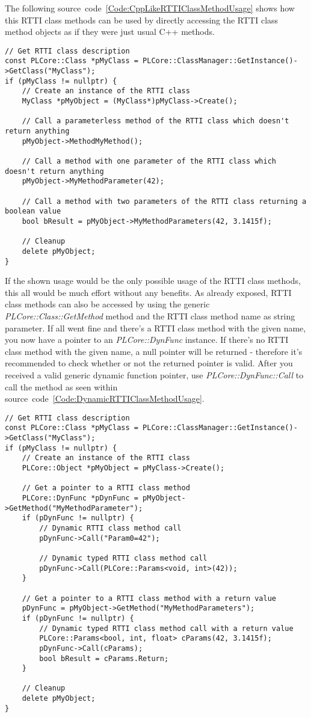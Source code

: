 The following source~code~\ref{Code:CppLikeRTTIClassMethodUsage} shows how this RTTI class methods can be used by directly accessing the RTTI class method objects as if they were just usual C++ methods.
\begin{lstlisting}[label=Code:CppLikeRTTIClassMethodUsage,caption={Accessing RTTI class method objects as if they were just usual C++ methods}]
// Get RTTI class description
const PLCore::Class *pMyClass = PLCore::ClassManager::GetInstance()->GetClass("MyClass");
if (pMyClass != nullptr) {
	// Create an instance of the RTTI class
	MyClass *pMyObject = (MyClass*)pMyClass->Create();

	// Call a parameterless method of the RTTI class which doesn't return anything
	pMyObject->MethodMyMethod();

	// Call a method with one parameter of the RTTI class which doesn't return anything
	pMyObject->MyMethodParameter(42);

	// Call a method with two parameters of the RTTI class returning a boolean value
	bool bResult = pMyObject->MyMethodParameters(42, 3.1415f);

	// Cleanup
	delete pMyObject;
}
\end{lstlisting}
If the shown usage would be the only possible usage of the RTTI class methods, this all would be much effort without any benefits. As already exposed, RTTI class methods can also be accessed by using the generic \emph{PLCore::Class::GetMethod} method and the RTTI class method name as string parameter. If all went fine and there's a RTTI class method with the given name, you now have a pointer to an \emph{PLCore::DynFunc} instance. If there's no RTTI class method with the given name, a null pointer will be returned - therefore it's recommended to check whether or not the returned pointer is valid. After you received a valid generic dynamic function pointer, use \emph{PLCore::DynFunc::Call} to call the method as seen within source~code~\ref{Code:DynamicRTTIClassMethodUsage}.
\begin{lstlisting}[label=Code:DynamicRTTIClassMethodUsage,caption={Dynamically calling RTTI class methods}]
// Get RTTI class description
const PLCore::Class *pMyClass = PLCore::ClassManager::GetInstance()->GetClass("MyClass");
if (pMyClass != nullptr) {
	// Create an instance of the RTTI class
	PLCore::Object *pMyObject = pMyClass->Create();

	// Get a pointer to a RTTI class method
	PLCore::DynFunc *pDynFunc = pMyObject->GetMethod("MyMethodParameter");
	if (pDynFunc != nullptr) {
		// Dynamic RTTI class method call
		pDynFunc->Call("Param0=42");

		// Dynamic typed RTTI class method call
		pDynFunc->Call(PLCore::Params<void, int>(42));
	}

	// Get a pointer to a RTTI class method with a return value
	pDynFunc = pMyObject->GetMethod("MyMethodParameters");
	if (pDynFunc != nullptr) {
		// Dynamic typed RTTI class method call with a return value
		PLCore::Params<bool, int, float> cParams(42, 3.1415f);
		pDynFunc->Call(cParams);
		bool bResult = cParams.Return;
	}

	// Cleanup
	delete pMyObject;
}
\end{lstlisting}
